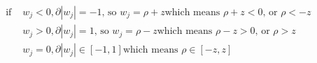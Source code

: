 \newcommand{\matrix}[1]{\mathbf{#1}}
\newcommand{\vector}[1]{\mathbf{#1}}
\newcommand{\X}{\matrix{X}}
\newcommand{\y}{\vector{y}}
\newcommand{\w}{\vector{w}}
\newcommand{\r}{\vector{r}}
\begin{align*}
\text{ if } & w_j < 0, \partial |w_j| = -1 \text{, so } w_j = \rho + z \text{which means } \rho + z < 0 \text{, or } \rho < -z \\
            & w_j > 0, \partial |w_j| =  1 \text{, so } w_j = \rho - z \text{which means } \rho - z > 0 \text{, or } \rho >  z \\
            & w_j = 0, \partial |w_j| \in [-1, 1]                      \text{which means } \rho \in  [-z, z] \\
\end{align*}
